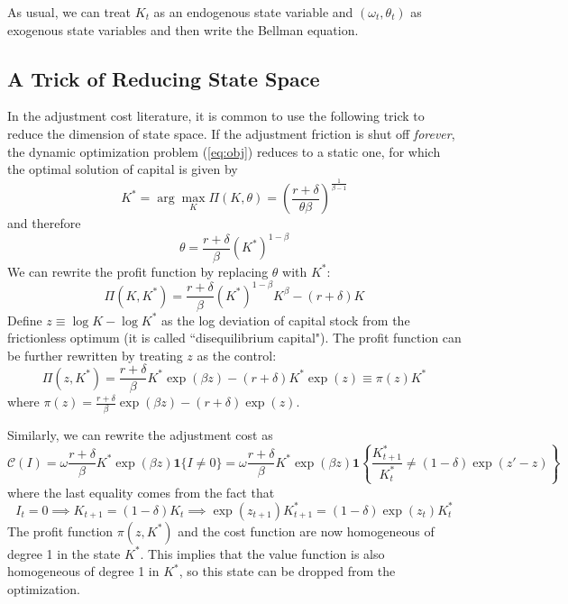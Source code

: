 \documentclass[12pt]{article}
\begin{document}
As usual, we can treat $K_t$ as an endogenous state variable and $(\omega_t, \theta_t)$ as exogenous state variables and then write the Bellman equation. 

\subsection{A Trick of Reducing State Space}

In the adjustment cost literature, it is common to use the following trick to reduce the dimension of state space. If the adjustment friction is shut off \textit{forever}, the dynamic optimization problem (\ref{eq:obj}) reduces to a static one, for which the optimal solution of capital is given by
\begin{equation}
	K^* = \arg \max_{K} \Pi(K, \theta) = \left(\frac{r+\delta}{\theta \beta}\right)^{\frac{1}{\beta-1}}
\end{equation}
and therefore
\begin{equation}
	\theta = \frac{r+\delta}{\beta} (K^*)^{1-\beta}
\end{equation}
We can rewrite the profit function by replacing $\theta$ with $K^*$:
\begin{equation*}
	\Pi(K, K^*) = \frac{r+\delta}{\beta} (K^*)^{1-\beta} K^\beta - (r+\delta) K
\end{equation*}
Define $z \equiv \log K - \log K^*$ as the log deviation of capital stock from the frictionless optimum (it is called ``disequilibrium capital"). The profit function can be further rewritten by treating $z$ as the control:
\begin{equation}
	\Pi(z, K^*) = \frac{r+\delta}{\beta} K^* \exp(\beta z) - (r+\delta) K^* \exp(z) \equiv \pi(z) K^*
\end{equation}
where $\pi(z) = \frac{r+\delta}{\beta} \exp(\beta z) - (r+\delta) \exp(z)$.

Similarly, we can rewrite the adjustment cost as
\begin{equation}
	\mathcal{C}(I) = \omega \frac{r+\delta}{\beta} K^* \exp(\beta z) \mathbf{1}\{I \neq 0\} = \omega \frac{r+\delta}{\beta} K^* \exp(\beta z) \mathbf{1}\left\{\frac{K_{t+1}^*}{K_t^*} \neq (1-\delta)\exp(z' - z)\right\} 
\end{equation}
where the last equality comes from the fact that 
\[I_t = 0 \implies K_{t+1} = (1-\delta) K_t \implies \exp(z_{t+1}) K_{t+1}^* = (1-\delta) \exp(z_t) K_t^*\]
The profit function $\pi(z, K^*)$ and the cost function are now homogeneous of degree 1 in the state $K^*$. This implies that the value function is also homogeneous of degree 1 in $K^*$, so this state can be dropped from the optimization. 
\end{document}
